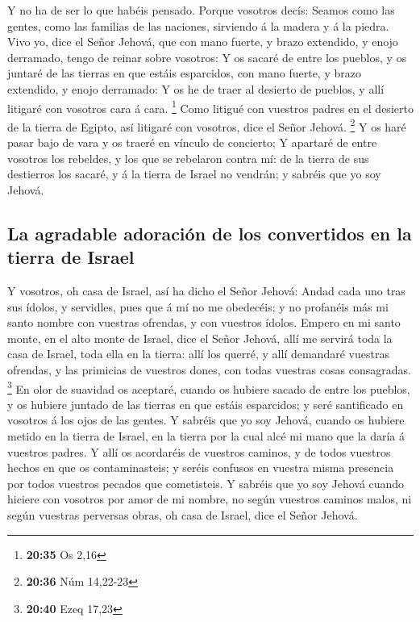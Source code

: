  Y no ha de ser lo que habéis pensado. Porque vosotros
decís: Seamos como las gentes, como las familias de las naciones,
sirviendo á la madera y á la piedra.  Vivo yo, dice el
Señor Jehová, que con mano fuerte, y brazo extendido, y enojo derramado,
tengo de reinar sobre vosotros:  Y os sacaré de entre los
pueblos, y os juntaré de las tierras en que estáis esparcidos, con mano
fuerte, y brazo extendido, y enojo derramado:  Y os he de
traer al desierto de pueblos, y allí litigaré con vosotros cara á cara.
\footnote{\textbf{20:35} Os 2,16}  Como litigué con
vuestros padres en el desierto de la tierra de Egipto, así litigaré con
vosotros, dice el Señor Jehová. \footnote{\textbf{20:36} Núm 14,22-23}
 Y os haré pasar bajo de vara y os traeré en vínculo de
concierto;  Y apartaré de entre vosotros los rebeldes, y
los que se rebelaron contra mí: de la tierra de sus destierros los
sacaré, y á la tierra de Israel no vendrán; y sabréis que yo soy Jehová.

\hypertarget{la-agradable-adoraciuxf3n-de-los-convertidos-en-la-tierra-de-israel}{%
\subsection{La agradable adoración de los convertidos en la tierra de
Israel}\label{la-agradable-adoraciuxf3n-de-los-convertidos-en-la-tierra-de-israel}}

 Y vosotros, oh casa de Israel, así ha dicho el Señor
Jehová: Andad cada uno tras sus ídolos, y servidles, pues que á mí no me
obedecéis; y no profanéis más mi santo nombre con vuestras ofrendas, y
con vuestros ídolos.  Empero en mi santo monte, en el alto
monte de Israel, dice el Señor Jehová, allí me servirá toda la casa de
Israel, toda ella en la tierra: allí los querré, y allí demandaré
vuestras ofrendas, y las primicias de vuestros dones, con todas vuestras
cosas consagradas. \footnote{\textbf{20:40} Ezeq 17,23}  En
olor de suavidad os aceptaré, cuando os hubiere sacado de entre los
pueblos, y os hubiere juntado de las tierras en que estáis esparcidos; y
seré santificado en vosotros á los ojos de las gentes.  Y
sabréis que yo soy Jehová, cuando os hubiere metido en la tierra de
Israel, en la tierra por la cual alcé mi mano que la daría á vuestros
padres.  Y allí os acordaréis de vuestros caminos, y de
todos vuestros hechos en que os contaminasteis; y seréis confusos en
vuestra misma presencia por todos vuestros pecados que cometisteis.
 Y sabréis que yo soy Jehová cuando hiciere con vosotros
por amor de mi nombre, no según vuestros caminos malos, ni según
vuestras perversas obras, oh casa de Israel, dice el Señor Jehová.

